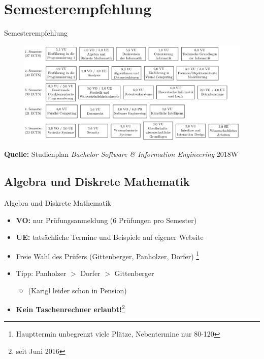 \documentclass{beamer}
\begin{document}
\section{Semesterempfehlung}
\begin{frame}{Semesterempfehlung}
    \begin{figure}[htp]
        \centering
        \includegraphics[width=1\textwidth]{semesterempfehlung.png}
    \end{figure}
    \tiny \textbf{Quelle:} Studienplan \textit{Bachelor Software \&
        Information Engineering} 2018W
\end{frame}

\subsection{Algebra und Diskrete Mathematik}
\begin{frame}{Algebra und Diskrete Mathematik}
    \begin{itemize}
        \item \textbf{VO:} nur Prüfungsanmeldung (6 Prüfungen pro Semester)
        \item \textbf{UE:} tatsächliche Termine und Beispiele auf eigener Website
        \item Freie Wahl des Prüfers (Gittenberger, Panholzer, Dorfer)
            \footnote{Haupttermin unbegrenzt viele Plätze, Nebentermine nur 80-120}
        \item Tipp: Panholzer $>$ Dorfer $>$ Gittenberger
            \begin{itemize}
                \item (Karigl leider schon in Pension)
            \end{itemize}
        \item \textbf{Kein Taschenrechner erlaubt!}\footnote{seit Juni 2016}
    \end{itemize}
\end{frame}
\end{document}
